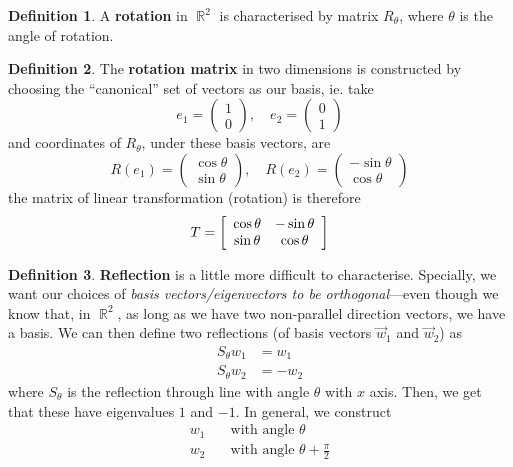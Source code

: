 \documentclass[11pt]{amsart} %
\theoremstyle{definition}
\newtheorem{definition}{Definition}[section]
\theoremstyle{definition}
\DeclareMathOperator{\R}{\mathbb{R}}
\numberwithin{equation}{section}
\begin{document}
\begin{definition}
	A \textbf{rotation} in $\R^2$ is characterised by matrix $R_{\theta}$, where $\theta$ is the angle of rotation.
\end{definition}

\begin{definition}
	The \textbf{rotation matrix} in two dimensions is constructed by choosing the ``canonical'' set of vectors as our basis, ie. take
	$$ e_1 = \left(\begin{array}{c}  1 \\0  \end{array}\right) , \quad e_2 = \left(\begin{array}{c} 0 \\ 1  \end{array}\right) $$
	and coordinates of $R_{\theta}$, under these basis vectors, are
		$$ R(e_1) = \left(\begin{array}{c}  \cos \theta \\ \sin \theta \end{array}\right) , \quad R(e_2) = \left(\begin{array}{c} - \sin \theta \\ \cos \theta  \end{array}\right) $$
	the matrix of linear transformation (rotation) is therefore
		$$ T = \left[\begin{array}{ c c }  \cos \theta &  - \sin \theta \\ \sin \theta  & \cos \theta  \end{array}  \right] $$
\end{definition}

\begin{definition}
	\textbf{Reflection} is a little more difficult to characterise. Specially, we want our choices of \textit{basis vectors/eigenvectors to be orthogonal}---even though we know that, in $\R^2$, as long as we have two non-parallel direction vectors, we have a basis. We can then define two reflections (of basis vectors $\vec{w}_1$ and $\vec{w}_2$) as
	\begin{align*}
	 S_{\theta} w_1 & = w_1 \\
	 S_{\theta} w_2 & = - w_2  
	\end{align*}
	where $S_{\theta}$ is the reflection through line with angle $\theta$ with $x$ axis. Then, we get that these have eigenvalues $1$ and $-1$. In general, we construct
	\begin{align*}
		w_1 \quad &\text{with angle } \theta \\
		w_2 \quad &\text{with angle } \theta + \frac{\pi}{2}
	\end{align*}
\end{definition}
\end{document}
